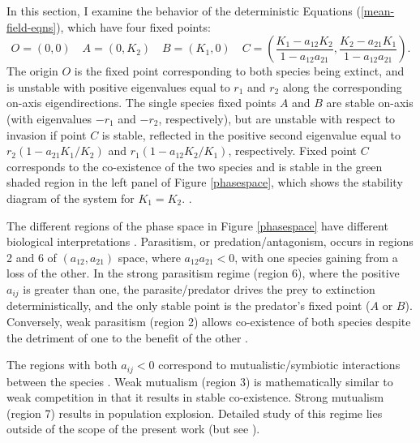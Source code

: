 In this section, I examine the behavior of the deterministic Equations (\ref{mean-field-eqns}), which have four fixed points:
\begin{equation}
O = (0,0) \quad A = (0,K_2) \quad B = (K_1,0) \quad C = (\frac{K_1-a_{12} K_2}{1-a_{12}a_{21}},\frac{K_2-a_{21} K_1}{1-a_{12}a_{21}}). %
\end{equation}
The origin $O$ is the fixed point corresponding to both species being extinct, and is unstable with positive eigenvalues equal to $r_1$ and $r_2$ along the corresponding on-axis eigendirections. 
The single species fixed points $A$ and $B$ are stable on-axis (with eigenvalues $-r_1$ and $-r_2$, respectively), but are unstable with respect to invasion if point $C$ is stable, reflected in the positive second eigenvalue equal to $r_2(1-a_{21}K_1/K_2)$ and $r_1(1-a_{12}K_2/K_1)$, respectively. 
Fixed point $C$ corresponds to the co-existence of the two species and is stable in the green shaded region in the left panel of Figure \ref{phasespace}, which shows the stability diagram of the system for $K_1=K_2$. \cite{Neuhauser1999,Cox2010,Chotibut2015}. %

The different regions of the phase space in Figure \ref{phasespace} have different biological interpretations \cite{May2001,Abrams1977}. 
Parasitism, or predation/antagonism, occurs in regions 2 and 6 of $(a_{12}, a_{21})$ space, where $a_{12}a_{21}<0$, with one species gaining from a loss of the other. 
In the strong parasitism regime (region 6), where the positive $a_{ij}$ is greater than one, the parasite/predator drives the prey to extinction deterministically, and the only stable point is the predator's fixed point ($A$ or $B$). 
Conversely, weak parasitism (region 2) allows co-existence of both species despite the detriment of one to the benefit of the other \cite{May2001,Chotibut2015}. 

The regions with both $a_{ij}<0$ correspond to mutualistic/symbiotic interactions between the species \cite{Neuhauser1999,Cox2010,Chotibut2015,May2001}. 
Weak mutualism (region 3) is mathematically similar to weak competition in that it results in stable co-existence. 
Strong mutualism (region 7) results in population explosion. 
Detailed study of this regime lies outside of the scope of the present work (but see \cite{Meerson2008}).

